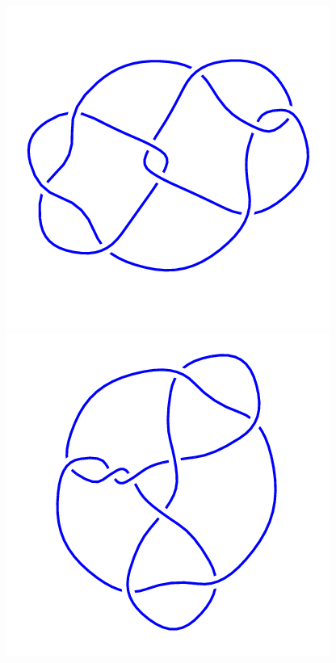 \begin{figure}[H]
    \begin{minipage}[b]{.18\linewidth}
        \centering
        \includegraphics[width=\linewidth]{../data/9_36.png}
    \end{minipage}
    \begin{minipage}[b]{.18\linewidth}
        \centering
        \includegraphics[width=\linewidth]{../data/9_37.png}

\end{minipage}
\end{figure}
